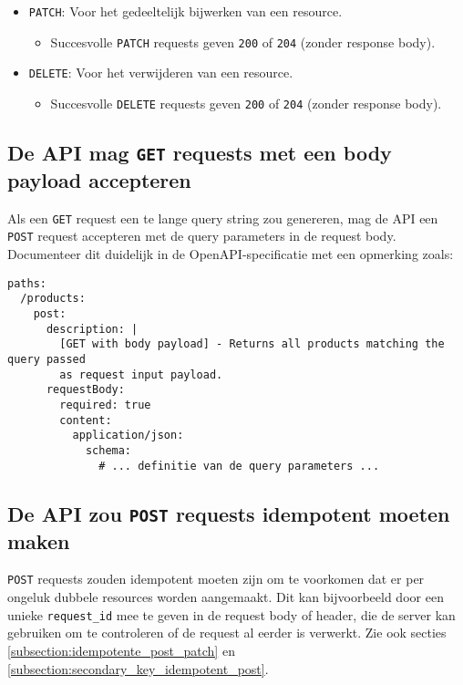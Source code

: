 \begin{itemize}
\begin{itemize}
    \end{itemize}
    \item \texttt{PATCH}: Voor het gedeeltelijk bijwerken van een resource.
    \begin{itemize}
        \item Succesvolle \texttt{PATCH} requests geven \texttt{200} of \texttt{204} (zonder response body).
    \end{itemize}
    \item \texttt{DELETE}: Voor het verwijderen van een resource.
    \begin{itemize}
        \item Succesvolle \texttt{DELETE} requests geven \texttt{200} of \texttt{204} (zonder response body).
    \end{itemize}
\end{itemize}

\subsection{De API mag \texttt{GET} requests met een body payload accepteren}
\label{subsection:get_met_body}

Als een \texttt{GET} request een te lange query string zou genereren, mag de API een \texttt{POST} request accepteren met de query parameters in de request body. Documenteer dit duidelijk in de OpenAPI-specificatie met een opmerking zoals:

\begin{verbatim}
paths:
  /products:
    post:
      description: |
        [GET with body payload] - Returns all products matching the query passed
        as request input payload.
      requestBody:
        required: true
        content:
          application/json:
            schema:
              # ... definitie van de query parameters ...
\end{verbatim}

\subsection{De API zou \texttt{POST} requests idempotent moeten maken}
\label{subsection:idempotente_post}

\texttt{POST} requests zouden idempotent moeten zijn om te voorkomen dat er per ongeluk dubbele resources worden aangemaakt. Dit kan bijvoorbeeld door een unieke \texttt{request\_id} mee te geven in de request body of header, die de server kan gebruiken om te controleren of de request al eerder is verwerkt. Zie ook secties \ref{subsection:idempotente_post_patch} en \ref{subsection:secondary_key_idempotent_post}.

